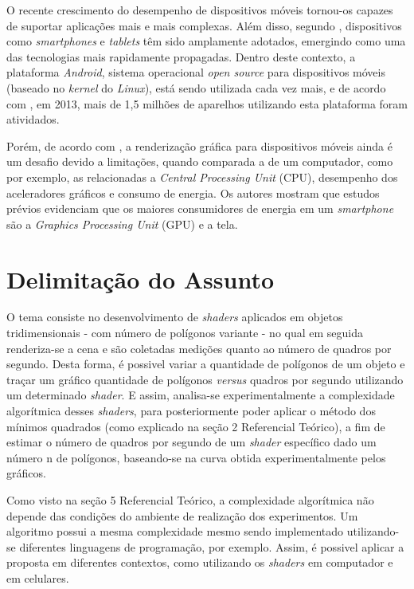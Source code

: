 	O recente crescimento do desempenho de dispositivos móveis tornou-os capazes de suportar aplicações mais e mais complexas. Além disso, segundo \cite{teapot}, dispositivos como \textit{smartphones} e \textit{tablets} têm sido amplamente adotados, emergindo como uma das tecnologias mais rapidamente propagadas. Dentro deste contexto, a plataforma \textit{Android},  sistema operacional  \textit{open source} para dispositivos móveis (baseado no \textit{kernel} do \textit{Linux}), está sendo utilizada cada vez mais, e de acordo com \cite{android2013}, em 2013, mais de 1,5 milhões de aparelhos utilizando esta plataforma foram atividados. 	

	 Porém, de acordo com \cite{x3d}, a renderização gráfica para dispositivos móveis ainda é um desafio devido a limitações, quando comparada a de um computador, como por exemplo, as relacionadas a \textit{Central Processing Unit} (CPU), desempenho dos aceleradores gráficos e consumo de energia. Os autores \cite{teapot} mostram que estudos prévios evidenciam que os maiores consumidores de energia em um \textit{smartphone} são a \textit{Graphics Processing Unit} (GPU) e a tela. 	
  

\section{Delimitação do Assunto}

O tema consiste no desenvolvimento de \textit{shaders} aplicados em objetos tridimensionais - com número de polígonos variante - no qual em seguida renderiza-se a cena e são coletadas medições quanto ao número de quadros por segundo. Desta forma, é possivel variar a quantidade de polígonos de um objeto e traçar um gráfico quantidade de polígonos \textit{versus} quadros por segundo utilizando um determinado \textit{shader}. E assim, analisa-se experimentalmente a complexidade algorítmica desses \textit{shaders}, para posteriormente poder aplicar o método dos mínimos quadrados (como explicado na seção 2 Referencial Teórico), a fim de estimar o número de quadros por segundo de um \textit{shader} específico dado um número n de polígonos, baseando-se na curva obtida experimentalmente pelos gráficos.  

Como visto na seção 5 Referencial Teórico, a complexidade algorítmica não depende das condições do ambiente de realização dos experimentos. Um algoritmo possui a mesma complexidade mesmo sendo implementado utilizando-se diferentes linguagens de programação, por exemplo. Assim, é possivel aplicar a proposta em diferentes contextos, como utilizando os \textit{shaders} em computador e em celulares. 


